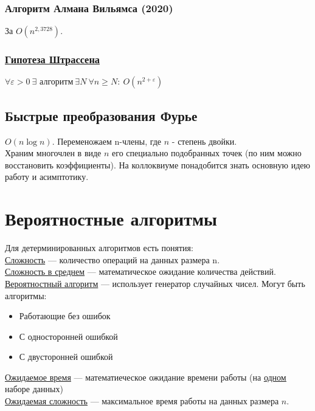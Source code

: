 \documentclass[12pt, a4paper]{article}
\begin{document}
    \subsubsection*{Алгоритм Алмана Вильямса (2020)}
    За $O(n^{2,3728})$.\\
    \subsubsection*{\underline{Гипотеза Штрассена}}
    $\forall \varepsilon > 0\ \exists \text{ алгоритм}\ \exists N\ \forall n \geq N:\ O(n^{2 + \varepsilon})$
    \subsection{Быстрые преобразования Фурье}
    $O(n\log n)$. Переменожаем n-члены, где $n$ - степень двойки.\\
    Храним многочлен в виде $n$ его специально подобранных точек (по ним можно восстановить коэффициенты). На коллоквиуме понадобится знать 
    основную идею работу и асимптотику.
    \section{Вероятностные алгоритмы}
    Для детерминированных алгоритмов есть понятия:\\
    \underline{Сложность} --- количество операций на данных размера n.\\
    \underline{Сложность в среднем} --- математическое ожидание количества действий.
    \underline{Вероятностный алгоритм} --- использует генератор случайных чисел.
    Могут быть алгоритмы:
    \begin{itemize}
        \item Работающие без ошибок
        \item С односторонней ошибкой
        \item С двусторонней ошибкой
    \end{itemize}
    \underline{Ожидаемое время} --- математиеческое ожидание времени работы (на \underline{\underline{одном}} наборе данных)\\
    \underline{Ожидаемая сложность} --- максимальное время работы на данных размера $n$.\\
\end{document}
